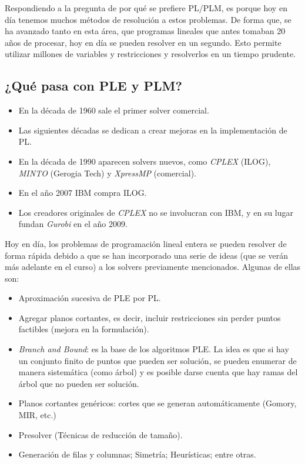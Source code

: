 Respondiendo a la pregunta de por qué se prefiere PL/PLM, es porque hoy en día tenemos muchos métodos de resolución a estos problemas. De forma que, se ha avanzado tanto en esta área, que programas lineales que antes tomaban 20 años de procesar, hoy en día se pueden resolver en un segundo. Esto permite utilizar millones de variables y restricciones y resolverlos en un tiempo prudente.

\subsection*{¿Qué pasa con PLE y PLM?}
\begin{itemize}
    \item En la década de 1960 sale el primer solver comercial.
    \item Las siguientes décadas se dedican a crear mejoras en la implementación de PL.
    \item En la década de 1990 aparecen solvers nuevos, como \textit{CPLEX} (ILOG), \textit{MINTO} (Gerogia Tech) y \textit{XpressMP} (comercial).
    \item En el año 2007 IBM compra ILOG.
    \item Los creadores originales de \textit{CPLEX} no se involucran con IBM, y en su lugar fundan \textit{Gurobi} en el año 2009.
\end{itemize}

Hoy en día, los problemas de programación lineal entera se pueden resolver de forma rápida debido a que se han incorporado una serie de ideas (que se verán más adelante en el curso) a los solvers previamente mencionados. Algunas de ellas son:
\begin{itemize}
    \item Aproximación sucesiva de PLE por PL.
    \item Agregar planos cortantes, es decir, incluir restricciones sin perder puntos factibles (mejora en la formulación).
    \item \textit{Branch and Bound}: es la base de los algoritmos PLE. La idea es que si hay un conjunto finito de puntos que pueden ser solución, se pueden enumerar de manera sistemática (como árbol) y es posible darse cuenta que hay ramas del árbol que no pueden ser solución.
    \item Planos cortantes genéricos: cortes que se generan automáticamente (Gomory, MIR, etc.)
    \item Presolver (Técnicas de reducción de tamaño).
    \item Generación de filas y columnas; Simetría; Heurísticas; entre otras.
\end{itemize}

